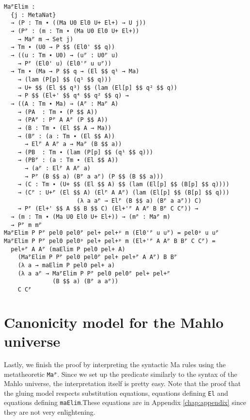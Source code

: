 \newpage
\begin{verbatim}
MaᴾElim :
  {j : MetaNat}
  → (P : Tm ∙ ((Ma U0 El0 U+ El+) → U j))
  → (Pᴾ : (m : Tm ∙ (Ma U0 El0 U+ El+))
    → Maᴾ m → Set j)
  → Tm ∙ (U0 → P $$ (El0' $$ q))
  → ((u : Tm ∙ U0) → (uᴾ : U0ᴾ u)
    → Pᴾ (El0' u) (El0'ᴾ u uᴾ))
  → Tm ∙ (Ma → P $$ q → (El $$ q¹ → Ma)
    → (lam (P[p] $$ (q¹ $$ q)))
    → U+ $$ (El $$ q³) $$ (lam (El[p] $$ q² $$ q))
    → P $$ (El+' $$ q⁴ $$ q² $$ q) →
  → ((A : Tm ∙ Ma) → (Aᴾ : Maᴾ A)
    → (PA  : Tm ∙ (P $$ A))
    → (PAᴾ : Pᴾ A Aᴾ (P $$ A))
    → (B : Tm ∙ (El $$ A → Ma))
    → (Bᴾ : (a : Tm ∙ (El $$ A))
      → Elᴾ A Aᴾ a → Maᴾ (B $$ a))
    → (PB  : Tm ∙ (lam (P[p] $$ (q¹ $$ q)))
    → (PBᴾ : (a : Tm ∙ (El $$ A))
      → (aᴾ : Elᴾ A Aᴾ a)
      → Pᴾ (B $$ a) (Bᴾ a aᴾ) (P $$ (B $$ a)))
    → (C : Tm ∙ (U+ $$ (El $$ A) $$ (lam (El[p] $$ (B[p] $$ q))))
    → (Cᴾ : U+ᴾ (El $$ A) (Elᴾ A Aᴾ) (lam (El[p] $$ (B[p] $$ q)))
                     (λ a aᴾ → Elᴾ (B $$ a) (Bᴾ a aᴾ)) C)
    → Pᴾ (El+' $$ A $$ B $$ C) (El+'ᴾ A Aᴾ B Bᴾ C Cᴾ)) →
  → (m : Tm ∙ (Ma U0 El0 U+ El+)) → (mᴾ : Maᴾ m)
  → Pᴾ m mᴾ
MaᴾElim P Pᴾ pel0 pel0ᴾ pel+ pel+ᵖ m (El0'ᴾ u uᴾ) = pel0ᵖ u uᴾ
MaᴾElim P Pᴾ pel0 pel0ᵖ pel+ pel+ᵖ m (El+'ᴾ A Aᴾ B Bᴾ C Cᴾ) =
  pel+ᴾ A Aᴾ (maElim P pel0 pel+ A)
    (MaᴾElim P Pᴾ pel0 pel0ᴾ pel+ pel+ᴾ A Aᴾ) B Bᴾ
    (λ a → maElim P pel0 pel+ a)
    (λ a aᴾ → MaᴾElim P Pᴾ pel0 pel0ᴾ pel+ pel+ᴾ
              (B $$ a) (Bᴾ a aᴾ))
    C Cᴾ
\end{verbatim}

\section{Canonicity model for the Mahlo universe}
Lastly, we finish the proof by interpreting the syntactic Ma rules using the metatheoretic \texttt{Maᴾ}. Since we set up the predicate similarly to the syntax of the Mahlo universe, the interpretation itself is pretty easy. Note that the proof that the gluing model respects substitution equations, equations defining \texttt{El} and equations defining \texttt{maElim}.These equations are in Appendix \ref{chap:appendix} since they are not very enlightening.

\newpage

